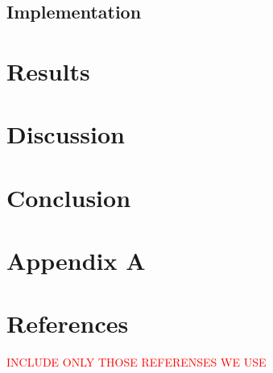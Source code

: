 \documentclass[norsk,a4paper,12pt]{article}
\begin{document}
\subsection{Implementation}

\section{Results} \label{sec:Results}

\section{Discussion} \label{sec:Discussion}

\section{Conclusion} \label{sec:Conclusion}

\newpage

\section{Appendix A} \label{sec:appendix_A}

\newpage
\section{References}

\textcolor{red}{INCLUDE ONLY THOSE REFERENSES WE USE}
\end{document}
